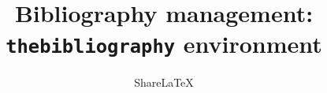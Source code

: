 \documentclass[a4paper,10pt]{article}
\title{Bibliography management:\\\texttt{thebibliography} environment}
\author{Share\LaTeX}
\begin{document}
\maketitle



\medskip
\end{document}
